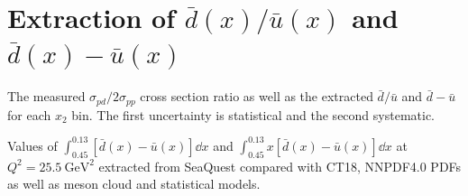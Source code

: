 \documentclass[reprint,aps,unsortedaddress,superscriptaddress,prl,floatfix,showpacs,linenumbers]{revtex4-2}
\begin{document}
\section{Extraction of \texorpdfstring{$\bar{d}\left(x\right)/\bar{u}\left(x\right)$}{dbar(x)/ubar(x)}
  and \texorpdfstring{$\bar{d}\left(x\right)-\bar{u}\left(x\right)$}{dbar(x)-ubar(x)}}
\label{sec:extraction}
\begin{table}[htbp!]
	\centering
	\caption{The measured $\sigma_{pd}/2\sigma_{pp}$ cross section ratio as well
		as the extracted $\bar{d}/\bar{u}$ and $\bar{d}-\bar{u}$ for each $x_{2}$ bin.
		The first uncertainty is statistical and the second systematic.}
	\begin{adjustbox}{max width=\textwidth}
		
	\end{adjustbox}
\end{table}
\begin{table}[htbp!]
	\centering
	\caption{Values of $\int_{0.45}^{0.13} \left[\bar{d}\left(x\right) - \bar{u}\left(x\right)\right] \dd{x}$
		and $\int_{0.45}^{0.13} x\left[\bar{d}\left(x\right) - \bar{u}\left(x\right)\right] \dd{x}$ at $Q^2=\SI{25.5}{\GeV\squared}$ extracted from
		SeaQuest compared with CT18, NNPDF4.0 PDFs as well as meson cloud and statistical models.}
	\begin{adjustbox}{max width=\textwidth}
		
	\end{adjustbox}
\end{table}
\end{document}
